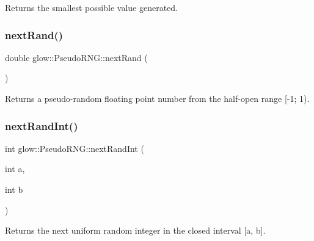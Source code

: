 \begin{DoxyReturn}{Returns}
the smallest possible value generated. 
\end{DoxyReturn}
\mbox{\label{classglow_1_1_pseudo_r_n_g_a1422103880800d95e63e393e37fca771}} 
\subsubsection{\texorpdfstring{next\+Rand()}{nextRand()}}
{\footnotesize\ttfamily double glow\+::\+Pseudo\+R\+N\+G\+::next\+Rand (\begin{DoxyParamCaption}{ }\end{DoxyParamCaption})}

\begin{DoxyReturn}{Returns}
a pseudo-\/random floating point number from the half-\/open range \mbox{[}-\/1; 1). 
\end{DoxyReturn}
\mbox{\label{classglow_1_1_pseudo_r_n_g_ab1a884f81fbe5b640924727b0a86bb3e}} 
\subsubsection{\texorpdfstring{next\+Rand\+Int()}{nextRandInt()}}
{\footnotesize\ttfamily int glow\+::\+Pseudo\+R\+N\+G\+::next\+Rand\+Int (\begin{DoxyParamCaption}\item[{int}]{a,  }\item[{int}]{b }\end{DoxyParamCaption})\hspace{0.3cm}{\ttfamily [inline]}}

\begin{DoxyReturn}{Returns}
the next uniform random integer in the closed interval \mbox{[}a, b\mbox{]}. 
\end{DoxyReturn}
\mbox{\label{classglow_1_1_pseudo_r_n_g_ab4e260e38ef6928e8a0892e524e8b2a7}} 
